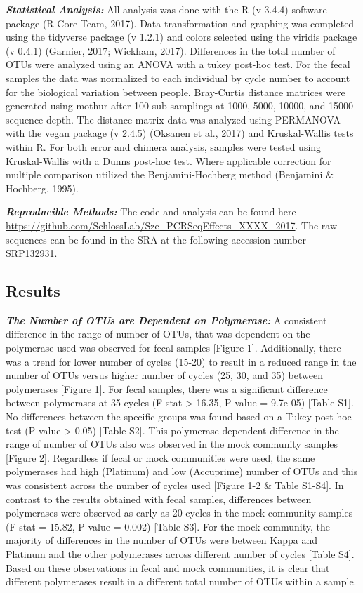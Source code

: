 \documentclass[12pt,]{article}
\begin{document}
\textbf{\emph{Statistical Analysis:}} All analysis was done with the R
(v 3.4.4) software package (R Core Team, 2017). Data transformation and
graphing was completed using the tidyverse package (v 1.2.1) and colors
selected using the viridis package (v 0.4.1) (Garnier, 2017; Wickham,
2017). Differences in the total number of OTUs were analyzed using an
ANOVA with a tukey post-hoc test. For the fecal samples the data was
normalized to each individual by cycle number to account for the
biological variation between people. Bray-Curtis distance matrices were
generated using mothur after 100 sub-samplings at 1000, 5000, 10000, and
15000 sequence depth. The distance matrix data was analyzed using
PERMANOVA with the vegan package (v 2.4.5) (Oksanen et al., 2017) and
Kruskal-Wallis tests within R. For both error and chimera analysis,
samples were tested using Kruskal-Wallis with a Dunns post-hoc test.
Where applicable correction for multiple comparison utilized the
Benjamini-Hochberg method (Benjamini \& Hochberg, 1995).

\textbf{\emph{Reproducible Methods:}} The code and analysis can be found
here \url{https://github.com/SchlossLab/Sze_PCRSeqEffects_XXXX_2017}.
The raw sequences can be found in the SRA at the following accession
number SRP132931.

\newpage

\subsection{Results}\label{results}

\textbf{\emph{The Number of OTUs are Dependent on Polymerase:}} A
consistent difference in the range of number of OTUs, that was dependent
on the polymerase used was observed for fecal samples {[}Figure 1{]}.
Additionally, there was a trend for lower number of cycles (15-20) to
result in a reduced range in the number of OTUs versus higher number of
cycles (25, 30, and 35) between polymerases {[}Figure 1{]}. For fecal
samples, there was a significant difference between polymerases at 35
cycles (F-stat \textgreater{} 16.35, P-value = 9.7e-05) {[}Table S1{]}.
No differences between the specific groups was found based on a Tukey
post-hoc test (P-value \textgreater{} 0.05) {[}Table S2{]}. This
polymerase dependent difference in the range of number of OTUs also was
observed in the mock community samples {[}Figure 2{]}. Regardless if
fecal or mock communities were used, the same polymerases had high
(Platinum) and low (Accuprime) number of OTUs and this was consistent
across the number of cycles used {[}Figure 1-2 \& Table S1-S4{]}. In
contrast to the results obtained with fecal samples, differences between
polymerases were observed as early as 20 cycles in the mock community
samples (F-stat = 15.82, P-value = 0.002) {[}Table S3{]}. For the mock
community, the majority of differences in the number of OTUs were
between Kappa and Platinum and the other polymerases across different
number of cycles {[}Table S4{]}. Based on these observations in fecal
and mock communities, it is clear that different polymerases result in a
different total number of OTUs within a sample.
\end{document}
